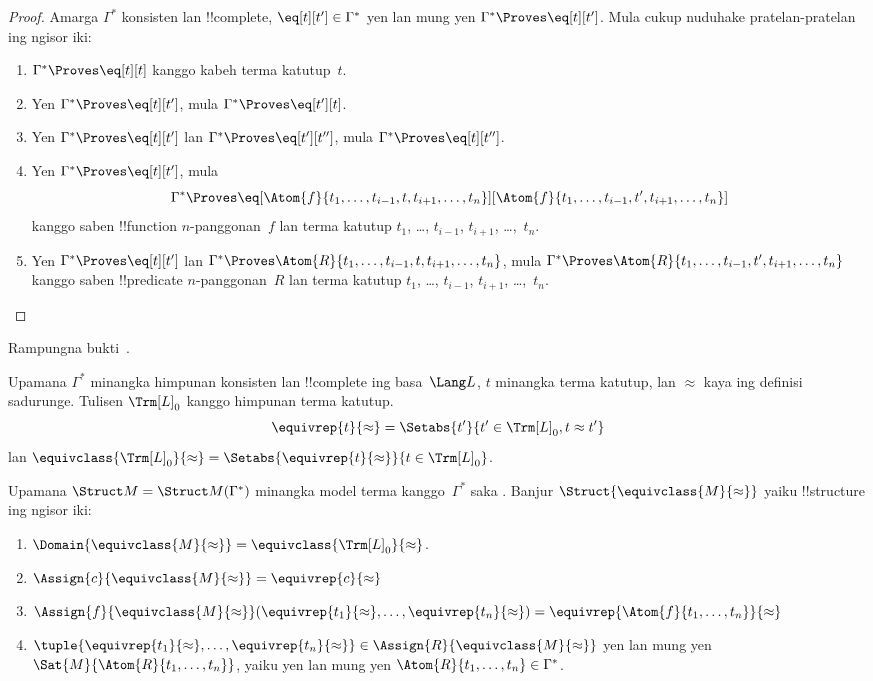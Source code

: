 \documentclass[../../../include/open-logic-section]{subfiles}
\begin{document}
\begin{proof}
Amarga $\Gamma^*$ konsisten lan !!{complete}, $\eq[t][t'] \in
\Gamma^*$ yen lan mung yen $\Gamma^* \Proves \eq[t][t']$. Mula cukup
nuduhake pratelan-pratelan ing ngisor iki:
\begin{enumerate}
\item $\Gamma^* \Proves \eq[t][t]$ kanggo kabeh terma katutup~$t$.
\item Yen $\Gamma^* \Proves \eq[t][t']$, mula $\Gamma^* \Proves
  \eq[t'][t]$.
\item Yen $\Gamma^* \Proves \eq[t][t']$ lan $\Gamma^* \Proves
  \eq[t'][t'']$, mula $\Gamma^* \Proves \eq[t][t'']$.
\item Yen $\Gamma^* \Proves \eq[t][t']$, mula
\[
\Gamma^* \Proves
\eq[\Atom{f}{t_1,\dots,t_{i-1},t,t_{i+1},\dots,t_n}][\Atom{f}{t_1,\dots,t_{i-1},t',t_{i+1},\dots,t_n}]
\]
kanggo saben !!{function} $n$-panggonan~$f$ lan terma katutup
$t_1$, \dots, $t_{i-1}$, $t_{i+1}$, \dots,~$t_n$.
\item Yen $\Gamma^* \Proves \eq[t][t']$ lan
$\Gamma^* \Proves
\Atom{R}{t_1,\dots,t_{i-1},t,t_{i+1},\dots,t_n}$, mula
$\Gamma^* \Proves \Atom{R}{t_1,\dots,t_{i-1},t',t_{i+1},\dots,t_n}$
kanggo saben !!{predicate} $n$-panggonan~$R$ lan terma katutup
$t_1$, \dots, $t_{i-1}$, $t_{i+1}$, \dots,~$t_n$.
\end{enumerate}
\end{proof}

\begin{prob}
Rampungna bukti~.
\end{prob}

\begin{defn}
Upamana $\Gamma^*$ minangka himpunan konsisten lan !!{complete} ing
basa~$\Lang L$, $t$ minangka terma katutup, lan $\approx$ kaya ing
definisi sadurunge. Tulisen ${\Trm[L]}_0$ kanggo himpunan terma katutup.
\[
\equivrep{t}{\approx} = \Setabs{t'}{t'\in {\Trm[L]}_0, t \approx t'}
\]
lan $\equivclass{{\Trm[L]}_0}{\approx} = \Setabs{\equivrep{t}{\approx}}{t \in {\Trm[L]}_0}$.
\end{defn}

\begin{defn}
Upamana $\Struct M = \Struct M(\Gamma^*)$ minangka model terma
kanggo~$\Gamma^*$ saka . Banjur
$\Struct{\equivclass{M}{\approx}}$ yaiku !!{structure} ing ngisor iki:
\begin{enumerate}
\item $\Domain{\equivclass{M}{\approx}} = \equivclass{{\Trm[L]}_0}{\approx}$.
\item $\Assign{c}{\equivclass{M}{\approx}} = \equivrep{c}{\approx}$
\item $\Assign{f}{\equivclass{M}{\approx}}(\equivrep{t_1}{\approx}, \dots,
  \equivrep{t_n}{\approx}) = \equivrep{\Atom{f}{t_1,\dots, t_n}}{\approx}$
\item $\tuple{\equivrep{t_1}{\approx}, \dots, \equivrep{t_n}{\approx}} \in
  \Assign{R}{\equivclass{M}{\approx}}$ yen lan mung yen
  $\Sat{M}{\Atom{R}{t_1,\dots, t_n}}$, yaiku yen lan mung yen
  $\Atom{R}{t_1,\dots, t_n} \in \Gamma^*$.
\end{enumerate}
\end{defn}
\end{document}
